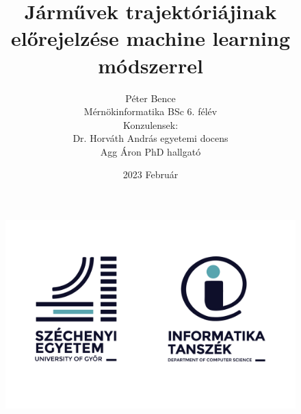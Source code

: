 \documentclass{article}
\title{Járművek trajektóriájinak előrejelzése machine learning módszerrel}
\author{Péter Bence\\Mérnökinformatika BSc 6. félév\\Konzulensek:\\Dr. Horváth András egyetemi docens\\Agg Áron PhD hallgató}
\date{2023 Február}
\begin{document}
    
    \begin{titlepage}
        \maketitle
        \begin{figure}[H]\centering
            \includegraphics[width=1\columnwidth]{sze_givk_logo.png}
        \end{figure}
    \end{titlepage}
\end{document}
